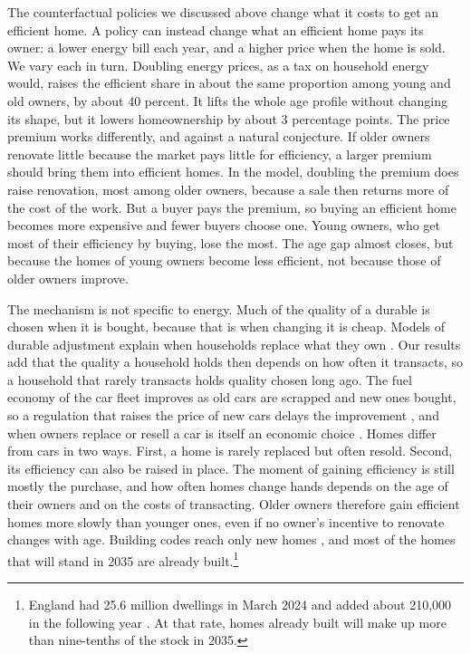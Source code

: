 The counterfactual policies we discussed above change what it costs to get an efficient home. A policy
can instead change what an efficient home pays its owner: a lower energy
bill each year, and a higher price when the home is sold. We vary each in
turn. Doubling energy prices, as a tax on household energy would, raises
the efficient share in about the same proportion among young and old
owners, by about 40 percent. It lifts the whole age profile without
changing its shape, but it lowers homeownership by about 3 percentage points. The price premium works differently, and against a
natural conjecture. If older owners renovate little because the market pays
little for efficiency, a larger premium should bring them into efficient
homes. In the model, doubling the premium does raise renovation, most among
older owners, because a sale then returns more of the cost of the work. But
a buyer pays the premium, so buying an efficient home becomes more
expensive and fewer buyers choose one. Young owners, who get most of their
efficiency by buying, lose the most. The age gap almost closes, but because
the homes of young owners become less efficient, not because those of older
owners improve.



The mechanism is not specific to energy. Much of the quality of a durable
is chosen when it is bought, because that is when changing it is cheap.
Models of durable adjustment explain when households replace what they own
\citep{grossman1990asset,eberly1994adjustment,attanasio2000consumer}. Our
results add that the quality a household holds then depends on how often
it transacts, so a household that rarely transacts holds quality chosen
long ago. The fuel economy of the car fleet improves as old cars are
scrapped and new ones bought, so a regulation that raises the price of new
cars delays the improvement
\citep{gruenspecht1982differentiated,stavins2006vintage,jacobsen2015vehicle},
and when owners replace or resell a car is itself an economic choice
\citep{adda2000balladurette,stolyarov2002turnover}.
Homes differ from cars in two ways. First, a home is rarely replaced but often
resold. Second, its efficiency can also be raised in place. The moment of
gaining efficiency is still mostly the purchase, and how often homes change hands depends on
the age of their owners and on the costs of transacting. Older owners
therefore gain efficient homes more slowly than younger ones,
even if no owner's incentive to renovate changes with age. Building codes
reach only new homes \citep{levinson2016energy,jacobsen2013building}, and
most of the homes that will stand in 2035 are already built.\footnote{England
had 25.6 million dwellings in March 2024 and added about 210,000 in the
following year \citep{mhclg2025supply}. At that rate, homes already built
will make up more than nine-tenths of the stock in 2035.}

